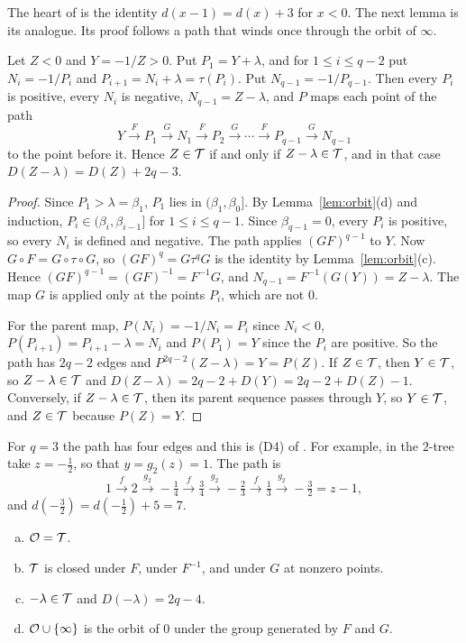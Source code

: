 The heart of \cite{P137} is the identity $d(x-1)=d(x)+3$ for $x<0$. The next lemma is its analogue.
Its proof follows a path that winds once through the orbit of $\infty$.

\begin{lemma}\label{lem:long}
Let $Z<0$ and $Y=-1/Z>0$. Put $P_1=Y+\lambda$, and for $1\le i\le q-2$ put $N_i=-1/P_i$ and
$P_{i+1}=N_i+\lambda=\tau(P_i)$. Put $N_{q-1}=-1/P_{q-1}$. Then every $P_i$ is positive, every $N_i$
is negative, $N_{q-1}=Z-\lambda$, and $P$ maps each point of the path
\[
Y\xrightarrow{\,F\,}P_1\xrightarrow{\,G\,}N_1\xrightarrow{\,F\,}P_2\xrightarrow{\,G\,}\cdots
\xrightarrow{\,F\,}P_{q-1}\xrightarrow{\,G\,}N_{q-1}
\]
to the point before it. Hence $Z\in\mathcal{T}$ if and only if $Z-\lambda\in\mathcal{T}$, and in that case
$D(Z-\lambda)=D(Z)+2q-3$.
\end{lemma}

\begin{proof}
Since $P_1>\lambda=\beta_1$, $P_1$ lies in $(\beta_1,\beta_0]$. By Lemma~\ref{lem:orbit}(d) and
induction, $P_i\in(\beta_i,\beta_{i-1}]$ for $1\le i\le q-1$. Since $\beta_{q-1}=0$, every $P_i$ is
positive, so every $N_i$ is defined and negative. The path applies $(GF)^{q-1}$ to $Y$. Now
$G\circ F=G\circ\tau\circ G$, so $(GF)^q=G\tau^qG$ is the identity by Lemma~\ref{lem:orbit}(c). Hence
$(GF)^{q-1}=(GF)^{-1}=F^{-1}G$, and $N_{q-1}=F^{-1}(G(Y))=Z-\lambda$. The map $G$ is applied only at the
points $P_i$, which are not $0$.

For the parent map, $P(N_i)=-1/N_i=P_i$ since $N_i<0$, $P(P_{i+1})=P_{i+1}-\lambda=N_i$ and
$P(P_1)=Y$ since the $P_i$ are positive. So the path has $2q-2$ edges and
$P^{2q-2}(Z-\lambda)=Y=P(Z)$. If $Z\in\mathcal{T}$, then $Y\in\mathcal{T}$, so $Z-\lambda\in\mathcal{T}$ and
$D(Z-\lambda)=2q-2+D(Y)=2q-2+D(Z)-1$. Conversely, if $Z-\lambda\in\mathcal{T}$, then its parent sequence passes
through $Y$, so $Y\in\mathcal{T}$, and $Z\in\mathcal{T}$ because $P(Z)=Y$.
\end{proof}

For $q=3$ the path has four edges and this is (D4) of \cite[Lemma~3.5]{P137}. For example, in the
$2$-tree take $z=-\tfrac12$, so that $y=g_2(z)=1$. The path is
\[
1\xrightarrow{f}2\xrightarrow{g_2}-\tfrac14\xrightarrow{f}\tfrac34\xrightarrow{g_2}-\tfrac23
\xrightarrow{f}\tfrac13\xrightarrow{g_2}-\tfrac32=z-1,
\]
and $d(-\tfrac32)=d(-\tfrac12)+5=7$.

\begin{proposition}\label{prop:closed}
\begin{enumerate}[(a)]
\item $\mathcal{O}=\mathcal{T}$.
\item $\mathcal{T}$ is closed under $F$, under $F^{-1}$, and under $G$ at nonzero points.
\item $-\lambda\in\mathcal{T}$ and $D(-\lambda)=2q-4$.
\item $\mathcal{O}\cup\{\infty\}$ is the orbit of $0$ under the group generated by $F$ and $G$.
\end{enumerate}
\end{proposition}

